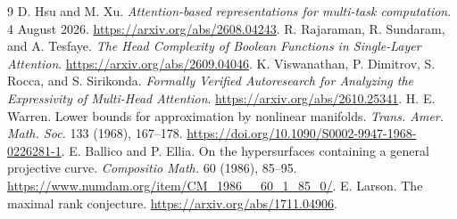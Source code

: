\documentclass[11pt]{article}
\begin{document}
\begin{thebibliography}{9}
 D. Hsu and M. Xu. \emph{Attention-based representations for multi-task computation}. 4 August 2026. \url{https://arxiv.org/abs/2608.04243}.
 R. Rajaraman, R. Sundaram, and A. Tesfaye. \emph{The Head Complexity of Boolean Functions in Single-Layer Attention}. \url{https://arxiv.org/abs/2609.04046}.
 K. Viswanathan, P. Dimitrov, S. Rocca, and S. Sirikonda. \emph{Formally Verified Autoresearch for Analyzing the Expressivity of Multi-Head Attention}. \url{https://arxiv.org/abs/2610.25341}.
 H. E. Warren. Lower bounds for approximation by nonlinear manifolds. \emph{Trans. Amer. Math. Soc.} 133 (1968), 167--178. \url{https://doi.org/10.1090/S0002-9947-1968-0226281-1}.
 E. Ballico and P. Ellia. On the hypersurfaces containing a general projective curve. \emph{Compositio Math.} 60 (1986), 85--95. \url{https://www.numdam.org/item/CM_1986__60_1_85_0/}.
 E. Larson. The maximal rank conjecture. \url{https://arxiv.org/abs/1711.04906}.
\end{thebibliography}
\end{document}
